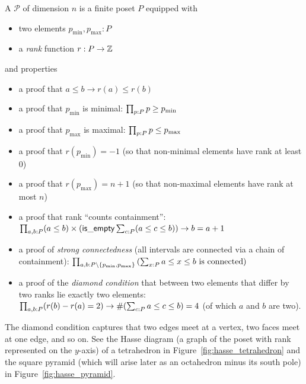 \begin{mydef}
A  \( \mathcal{P} \) of dimension \( n \) is a finite poset \( P \) equipped with 
\begin{itemize}
\item two elements \( p_{\mathrm{min}}, p_{\mathrm{max}}:P \)
\item a \emph{rank} function \( r:P\to \mathbb{Z} \)
\end{itemize}
and properties
\begin{itemize}
\item a proof that \( a\leq b\to r(a)\leq r(b) \)
\item a proof that \( p_{\mathrm{min}} \) is minimal: \( \prod_{p:P}p\geq p_{\mathrm{min}} \)
\item a proof that \( p_{\mathrm{max}} \) is maximal: \( \prod_{p:P}p\leq p_{\mathrm{max}} \)
\item a proof that \( r(p_{\mathrm{min}}) = -1 \) (so that non-minimal elements have rank at least 0)
\item a proof that \( r(p_{\mathrm{max}}) = n+1 \) (so that non-maximal elements have rank at most \( n \))
\item a proof that rank ``counts containment'': \( \prod_{a,b:P}(a\leq b)\times (\mathsf{is\_empty}\sum_{c:P}(a\leq c\leq b))\to b=a+1 \)
\item a proof of \emph{strong connectedness} (all intervals are connected via a chain of containment): \newline\( \prod_{a,b:P\setminus\{p_{\mathrm{min}}, p_{\mathrm{max}}\}}\left(\sum_{x:P}a\leq x\leq b\text{ is connected}\right) \)
\item a proof of the \emph{diamond condition} that between two elements that differ by two ranks lie exactly two elements: \( \prod_{a,b:P}(r(b)-r(a)=2)\to \#(\sum_{c:P}a\leq c\leq b)=4 \) (of which \( a \) and \( b \) are two).
\end{itemize}
\end{mydef}

The diamond condition captures that two edges meet at a vertex, two faces meet at one edge, and so on. See the Hasse diagram (a graph of the poset with rank represented on the \( y \)-axis) of a tetrahedron in Figure~\ref{fig:hasse_tetrahedron} and the square pyramid (which will arise later as an octahedron minus its south pole) in Figure~\ref{fig:hasse_pyramid}.

